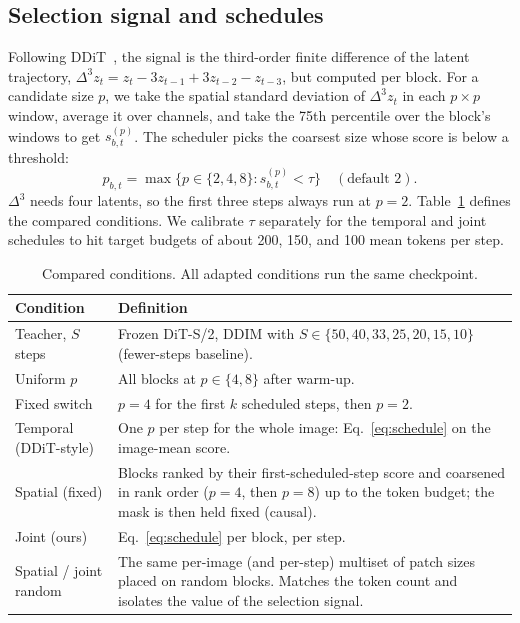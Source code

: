 \subsection{Selection signal and schedules}
\label{sec:schedules}
Following DDiT~\citep{kim2026ddit}, the signal is the third-order finite difference of the latent trajectory,
$\Delta^3 z_t=z_t-3z_{t-1}+3z_{t-2}-z_{t-3}$, but computed per block. For a candidate size $p$, we take the spatial standard deviation
of $\Delta^3 z_t$ in each $p{\times}p$ window, average it over channels, and take the 75th percentile over the block's windows to get
$s^{(p)}_{b,t}$. The scheduler picks the coarsest size whose score is below a threshold:
\begin{equation}
p_{b,t}=\max\{p\in\{2,4,8\}: s^{(p)}_{b,t}<\tau\}\quad(\text{default }2).
\label{eq:schedule}
\end{equation}
$\Delta^3$ needs four latents, so the first three steps always run at $p{=}2$.
Table~\ref{tab:arms} defines the compared conditions. We calibrate $\tau$ separately for the temporal and joint schedules to hit target
budgets of about 200, 150, and 100 mean tokens per step.

\begin{table}[t]
\centering
\small
\caption{Compared conditions. All adapted conditions run the same checkpoint.}
\label{tab:arms}
\begin{tabular}{p{3.0cm}p{9.6cm}}
\toprule
Condition & Definition \\
\midrule
Teacher, $S$ steps & Frozen DiT-S/2, DDIM with $S\in\{50,40,33,25,20,15,10\}$ (fewer-steps baseline). \\
Uniform $p$ & All blocks at $p\in\{4,8\}$ after warm-up. \\
Fixed switch & $p{=}4$ for the first $k$ scheduled steps, then $p{=}2$. \\
Temporal (DDiT-style) & One $p$ per step for the whole image: Eq.~\ref{eq:schedule} on the image-mean score. \\
Spatial (fixed) & Blocks ranked by their first-scheduled-step score and coarsened in rank order ($p{=}4$, then $p{=}8$) up to the
token budget; the mask is then held fixed (causal). \\
Joint (ours) & Eq.~\ref{eq:schedule} per block, per step. \\
Spatial / joint random & The same per-image (and per-step) multiset of patch sizes placed on random blocks. Matches the token count
and isolates the value of the selection signal. \\
\bottomrule
\end{tabular}
\end{table}


